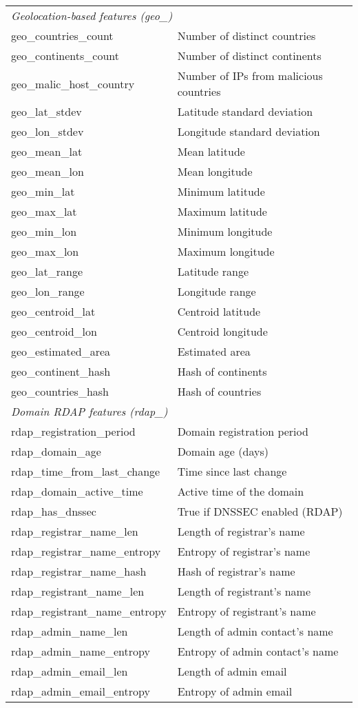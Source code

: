 \begin{longtable}{@{}ll@{}}
\midrule
\multicolumn{2}{l}{\emph{Geolocation-based features (geo\_)}} \\
geo\_countries\_count & Number of distinct countries \\
geo\_continents\_count & Number of distinct continents \\
geo\_malic\_host\_country & Number of IPs from malicious countries \\
geo\_lat\_stdev & Latitude standard deviation \\
geo\_lon\_stdev & Longitude standard deviation \\
geo\_mean\_lat & Mean latitude \\
geo\_mean\_lon & Mean longitude \\
geo\_min\_lat & Minimum latitude \\
geo\_max\_lat & Maximum latitude \\
geo\_min\_lon & Minimum longitude \\
geo\_max\_lon & Maximum longitude \\
geo\_lat\_range & Latitude range \\
geo\_lon\_range & Longitude range \\
geo\_centroid\_lat & Centroid latitude \\
geo\_centroid\_lon & Centroid longitude \\
geo\_estimated\_area & Estimated area \\
geo\_continent\_hash & Hash of continents \\
geo\_countries\_hash & Hash of countries \\

\midrule
\multicolumn{2}{l}{\emph{Domain RDAP features (rdap\_)}} \\
rdap\_registration\_period & Domain registration period \\
rdap\_domain\_age & Domain age (days) \\
rdap\_time\_from\_last\_change & Time since last change \\
rdap\_domain\_active\_time & Active time of the domain \\
rdap\_has\_dnssec & True if DNSSEC enabled (RDAP) \\
rdap\_registrar\_name\_len & Length of registrar's name \\
rdap\_registrar\_name\_entropy & Entropy of registrar's name \\
rdap\_registrar\_name\_hash & Hash of registrar's name \\
rdap\_registrant\_name\_len & Length of registrant's name \\
rdap\_registrant\_name\_entropy & Entropy of registrant's name \\
rdap\_admin\_name\_len & Length of admin contact's name \\
rdap\_admin\_name\_entropy & Entropy of admin contact's name \\
rdap\_admin\_email\_len & Length of admin email \\
rdap\_admin\_email\_entropy & Entropy of admin email \\


\end{longtable}
